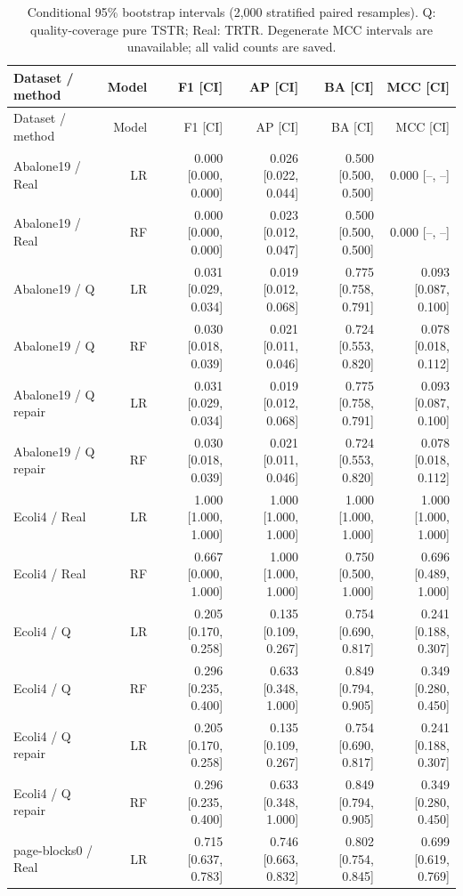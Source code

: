 \begin{longtable}{lrrrrr}
\caption{Conditional 95\% bootstrap intervals (2,000 stratified paired resamples). Q: quality-coverage pure TSTR; Real: TRTR. Degenerate MCC intervals are unavailable; all valid counts are saved.}\label{tab:bootstrap}\\
\toprule
Dataset / method & Model & F1 [CI] & AP [CI] & BA [CI] & MCC [CI] \\
\midrule\endfirsthead
\toprule
Dataset / method & Model & F1 [CI] & AP [CI] & BA [CI] & MCC [CI] \\
\midrule\endhead
Abalone19 / Real & LR & 0.000 [0.000, 0.000] & 0.026 [0.022, 0.044] & 0.500 [0.500, 0.500] & 0.000 [--, --] \\
Abalone19 / Real & RF & 0.000 [0.000, 0.000] & 0.023 [0.012, 0.047] & 0.500 [0.500, 0.500] & 0.000 [--, --] \\
Abalone19 / Q & LR & 0.031 [0.029, 0.034] & 0.019 [0.012, 0.068] & 0.775 [0.758, 0.791] & 0.093 [0.087, 0.100] \\
Abalone19 / Q & RF & 0.030 [0.018, 0.039] & 0.021 [0.011, 0.046] & 0.724 [0.553, 0.820] & 0.078 [0.018, 0.112] \\
Abalone19 / Q repair & LR & 0.031 [0.029, 0.034] & 0.019 [0.012, 0.068] & 0.775 [0.758, 0.791] & 0.093 [0.087, 0.100] \\
Abalone19 / Q repair & RF & 0.030 [0.018, 0.039] & 0.021 [0.011, 0.046] & 0.724 [0.553, 0.820] & 0.078 [0.018, 0.112] \\
Ecoli4 / Real & LR & 1.000 [1.000, 1.000] & 1.000 [1.000, 1.000] & 1.000 [1.000, 1.000] & 1.000 [1.000, 1.000] \\
Ecoli4 / Real & RF & 0.667 [0.000, 1.000] & 1.000 [1.000, 1.000] & 0.750 [0.500, 1.000] & 0.696 [0.489, 1.000] \\
Ecoli4 / Q & LR & 0.205 [0.170, 0.258] & 0.135 [0.109, 0.267] & 0.754 [0.690, 0.817] & 0.241 [0.188, 0.307] \\
Ecoli4 / Q & RF & 0.296 [0.235, 0.400] & 0.633 [0.348, 1.000] & 0.849 [0.794, 0.905] & 0.349 [0.280, 0.450] \\
Ecoli4 / Q repair & LR & 0.205 [0.170, 0.258] & 0.135 [0.109, 0.267] & 0.754 [0.690, 0.817] & 0.241 [0.188, 0.307] \\
Ecoli4 / Q repair & RF & 0.296 [0.235, 0.400] & 0.633 [0.348, 1.000] & 0.849 [0.794, 0.905] & 0.349 [0.280, 0.450] \\
page-blocks0 / Real & LR & 0.715 [0.637, 0.783] & 0.746 [0.663, 0.832] & 0.802 [0.754, 0.845] & 0.699 [0.619, 0.769] \\

\end{longtable}
